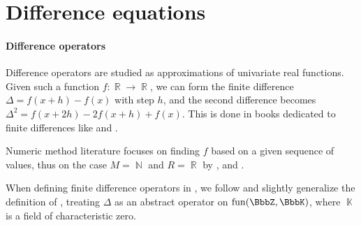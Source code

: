 \section{Difference equations}\label{sec:difference_equations}

\paragraph{Difference operators}

\begin{remark}\label{rem:finite_difference_literature_overview}
  Difference operators are studied as approximations of univariate real functions. Given such a function \( f: \BbbR \to \BbbR \), we can form the finite difference \( \Delta = f(x + h) - f(x) \) with step \( h \), and the second difference becomes \( \Delta^2 = f(x + 2h) - 2f(x + h) + f(x) \). This is done in books dedicated to finite differences like  and .

  Numeric method literature focuses on finding \( f \) based on a given sequence of values, thus on the case \( M = \BbbN \) and \( R = \BbbR \) by ,  and .

  When defining finite difference operators in , we follow and slightly generalize the definition of , treating \( \Delta \) as an abstract operator on \( \fun(\BbbZ, \BbbK) \), where \( \BbbK \) is a field of characteristic zero.
\end{remark}

